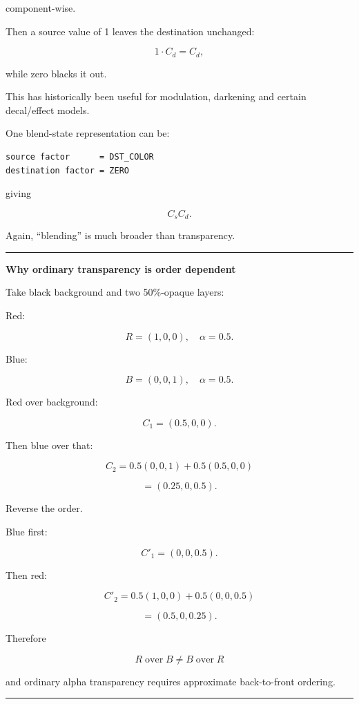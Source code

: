 component-wise.

Then a source value of 1 leaves the destination unchanged:

\[
1\cdot C_d=C_d,
\]

while zero blacks it out.

This has historically been useful for modulation, darkening and certain decal/effect models.

One blend-state representation can be:

\begin{verbatim}
source factor      = DST_COLOR
destination factor = ZERO
\end{verbatim}

giving

\[
C_sC_d.
\]

Again, ``blending'' is much broader than transparency.

\begin{center}\rule{0.5\linewidth}{0.5pt}\end{center}

\textbf{Why ordinary transparency is order dependent}

Take black background and two 50\%-opaque layers:

Red:

\[
R=(1,0,0),\quad \alpha=0.5.
\]

Blue:

\[
B=(0,0,1),\quad \alpha=0.5.
\]

Red over background:

\[
C_1=(0.5,0,0).
\]

Then blue over that:

\[
C_2
=
0.5(0,0,1)+0.5(0.5,0,0)
\]

\[
=
(0.25,0,0.5).
\]

Reverse the order.

Blue first:

\[
C'_1=(0,0,0.5).
\]

Then red:

\[
C'_2
=
0.5(1,0,0)+0.5(0,0,0.5)
\]

\[
=
(0.5,0,0.25).
\]

Therefore

\[
\boxed{
R\operatorname{over}B
\neq
B\operatorname{over}R
}
\]

and ordinary alpha transparency requires approximate back-to-front ordering.

\begin{center}\rule{0.5\linewidth}{0.5pt}\end{center}

